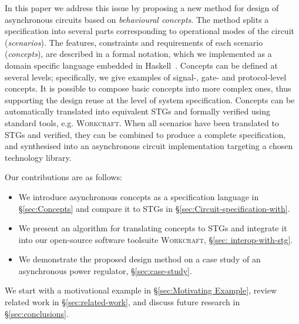 \documentclass[british,compsoc]{IEEEtran}
\newcommand{\noun}[1]{\textsc{#1}}
\begin{document}
In this paper we address this issue by proposing a new method for design
of asynchronous circuits based on \emph{behavioural concepts}.
The method splits a specification into several parts corresponding
to operational modes of the circuit (\emph{scenarios}). The features,
constraints and requirements of each scenario (\emph{concepts}),
are described in a formal notation, which we implemented as a domain
specific language embedded in Haskell~\cite{1996_hudak_dsl}. Concepts can
be defined at several levels; specifically, we give examples of signal-,
gate- and protocol-level concepts. It is possible to compose basic concepts
into more complex ones, thus supporting the design reuse at the level of system
specification.
Concepts can be automatically translated into equivalent STGs and
formally verified using standard tools, e.g. \noun{Workcraft}.
When all scenarios have been translated to STGs and verified, they can be
combined to produce a complete specification, and synthesised into an
asynchronous circuit implementation targeting a chosen technology library.

Our contributions are as follows:
\begin{itemize}
  \item We introduce asynchronous concepts as a specification
  language in \S\ref{sec:Concepts} and compare it to STGs in
  \S\ref{sec:Circuit-specification-with}.
  \item We present an algorithm for translating concepts to STGs
  and integrate it into our open-source software toolsuite \noun{Workcraft},
  \S\ref{sec: interop-with-stg}.
  \item We demonstrate the proposed design method on a case study of an
  asynchronous power regulator, \S\ref{sec:case-study}.
\end{itemize}

\noindent
We start with a motivational example in \S\ref{sec:Motivating Example}, review related work
in \S\ref{sec:related-work}, and discuss future research in \S\ref{sec:conclusions}.
\end{document}
